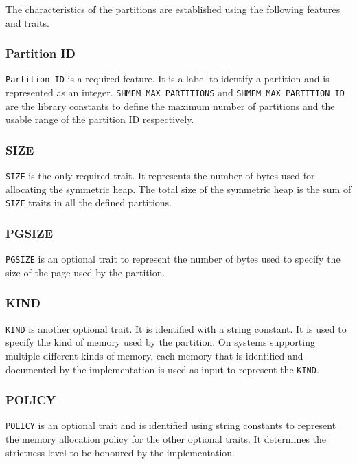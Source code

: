 The characteristics of the partitions are established using the
following features and traits.

\subsubsection{Partition ID} \texttt{Partition ID} is a required
feature. It is a label to identify a partition and is represented
as an integer. \texttt{SHMEM\_MAX\_PARTITIONS} and
\texttt{SHMEM\_MAX\_PARTITION\_ID} are the library constants to
define the maximum number of partitions and the usable range of
the partition ID respectively.

\subsubsection{SIZE} \texttt{SIZE} is the only required trait. It
represents the number of bytes used for allocating the symmetric
heap. The total size of the symmetric heap is %
the sum of \texttt{SIZE} traits in all the defined partitions.

\subsubsection{PGSIZE} \texttt{PGSIZE} is an optional trait to
represent the number of bytes used to specify the size of the
page used by the partition.

\subsubsection{KIND} \texttt{KIND} is another optional trait.
It is identified with a string constant. It is used to specify
the kind of memory used by the partition. On systems supporting
multiple different kinds of memory, each memory that is identified
and documented by the implementation is used as input to represent
the \texttt{KIND}.

\subsubsection{POLICY} \texttt{POLICY} is an optional trait and
is identified using string constants to represent the memory
allocation policy for the other optional traits. It determines
the strictness level to be honoured by the implementation.

